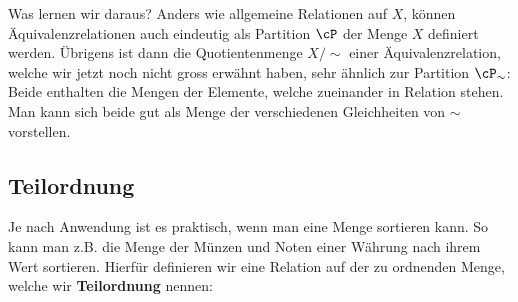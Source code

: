 Was lernen wir daraus? Anders wie allgemeine Relationen auf $X$, können Äquivalenzrelationen auch eindeutig als Partition $\cP$ der Menge $X$ definiert werden. Übrigens ist dann die Quotientenmenge $X/\!\sim$ einer Äquivalenzrelation, welche wir jetzt noch nicht gross erwähnt haben, sehr ähnlich zur Partition $\cP_\sim$: Beide enthalten die Mengen der Elemente, welche zueinander in Relation stehen. Man kann sich beide gut als Menge der verschiedenen Gleichheiten von $\sim$ vorstellen.

\subsection{Teilordnung} \label{cha_partial_order}
Je nach Anwendung ist es praktisch, wenn man eine Menge sortieren kann. So kann man z.B. die Menge der Münzen und Noten einer Währung nach ihrem Wert sortieren. Hierfür definieren wir eine Relation auf der zu ordnenden Menge, welche wir \textbf{Teilordnung} nennen:

